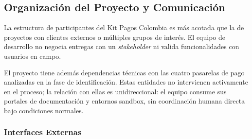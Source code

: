 \subsection{Organización del Proyecto y Comunicación}

La estructura de participantes del Kit Pagos Colombia es más acotada que la de proyectos con clientes externos o múltiples grupos de interés. El equipo de desarrollo no negocia entregas con un \textit{stakeholder} ni valida funcionalidades con usuarios en campo.

El proyecto tiene además dependencias técnicas con las cuatro pasarelas de pago analizadas en la fase de identificación. Estas entidades no intervienen activamente en el proceso; la relación con ellas es unidireccional: el equipo consume sus portales de documentación y entornos sandbox, sin coordinación humana directa bajo condiciones normales.

\subsubsection{Interfaces Externas}

